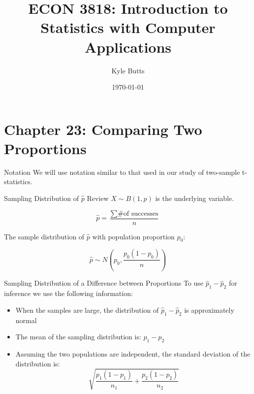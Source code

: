 \documentclass{beamer}
\title{ECON 3818: Introduction to Statistics with Computer Applications}
\date{\today}
\author{Kyle Butts}
\begin{document}
\maketitle


\section{Chapter 23: Comparing Two Proportions}
\begin{frame}{Notation}
	We will use notation similar to that used in our study of two-sample t-statistics.
	
	\begin{center}
	\end{center}
\end{frame}

\begin{frame}{Sampling Distribution of $\hat{p}$ Review}
	$X \sim B(1, p)$ is the underlying variable. 

	\[ \hat{p} = \frac{\sum \text{\# of successes}}{n} \]

	The sample distribution of $\hat{p}$ with population proportion $p_0$:

	\[ \hat{p} \sim N( p_0, \frac{p_0(1-p_0)}{n}) \]	
\end{frame}


\begin{frame}{Sampling Distribution of a Difference between Proportions}
	To use $\hat{p}_1 - \hat{p}_2$ for inference we use the following information:
	
	\begin{itemize}
		\item When the samples are large, the distribution of $\hat{p}_1 - \hat{p}_2$ is \alert{approximately normal}
		
		\item The \alert{mean} of the sampling distribution is: $p_1 - p_2$
		
		\item Assuming the two populations are independent, the \alert{standard deviation} of the distribution is: 
			\[ 
				\sqrt{\frac{p_1(1-p_1)}{n_1}+\frac{p_2(1-p_2)}{n_2}} 
			\]
	\end{itemize}
\end{frame}
\end{document}
